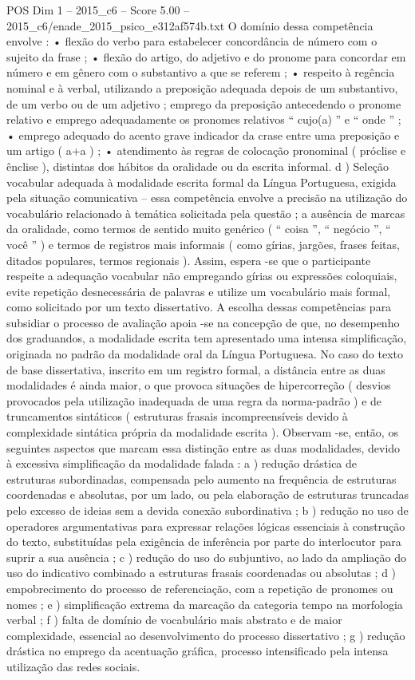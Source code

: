 \begin{textsample}{POS Dim 1 – 2015\_c6 – Score 5.00 – 2015\_c6/enade\_2015\_psico\_e312af574b.txt}
O domínio dessa competência envolve : • flexão do verbo para estabelecer concordância de número com o sujeito da frase ; • flexão do artigo, do adjetivo e do pronome para concordar em número e em gênero com o substantivo a que se referem ; • respeito à regência nominal e à verbal, utilizando a preposição adequada depois de um substantivo, de um verbo ou de um adjetivo ; emprego da preposição antecedendo o pronome relativo e emprego adequadamente os pronomes relativos “ cujo(a) ” e “ onde ” ; • emprego adequado do acento grave indicador da crase entre uma preposição e um artigo ( a+a ) ; • atendimento às regras de colocação pronominal ( próclise e ênclise ), distintas dos hábitos da oralidade ou da escrita informal. d ) Seleção vocabular adequada à modalidade escrita formal da Língua Portuguesa, exigida pela situação comunicativa – essa competência envolve a precisão na utilização do vocabulário relacionado à temática solicitada pela questão ; a ausência de marcas da oralidade, como termos de sentido muito genérico ( “ coisa ”, “ negócio ”, “ você ” ) e termos de registros mais informais ( como gírias, jargões, frases feitas, ditados populares, termos regionais ).
Assim, espera -se que o participante respeite a adequação vocabular não empregando gírias ou expressões coloquiais, evite repetição desnecessária de palavras e utilize um vocabulário mais formal, como solicitado por um texto dissertativo.
A escolha dessas competências para subsidiar o processo de avaliação apoia -se na concepção de que, no desempenho dos graduandos, a modalidade escrita tem apresentado uma intensa simplificação, originada no padrão da modalidade oral da Língua Portuguesa.
No caso do texto de base dissertativa, inscrito em um registro formal, a distância entre as duas modalidades é ainda maior, o que provoca situações de hipercorreção ( desvios provocados pela utilização inadequada de uma regra da norma-padrão ) e de truncamentos sintáticos ( estruturas frasais incompreensíveis devido à complexidade sintática própria da modalidade escrita ).
Observam -se, então, os seguintes aspectos que marcam essa distinção entre as duas modalidades, devido à excessiva simplificação da modalidade falada : a ) redução drástica de estruturas subordinadas, compensada pelo aumento na frequência de estruturas coordenadas e absolutas, por um lado, ou pela elaboração de estruturas truncadas pelo excesso de ideias sem a devida conexão subordinativa ; b ) redução no uso de operadores argumentativas para expressar relações lógicas essenciais à construção do texto, substituídas pela exigência de inferência por parte do interlocutor para suprir a sua ausência ; c ) redução do uso do subjuntivo, ao lado da ampliação do uso do indicativo combinado a estruturas frasais coordenadas ou absolutas ; d ) empobrecimento do processo de referenciação, com a repetição de pronomes ou nomes ; e ) simplificação extrema da marcação da categoria tempo na morfologia verbal ; f ) falta de domínio de vocabulário mais abstrato e de maior complexidade, essencial ao desenvolvimento do processo dissertativo ; g ) redução drástica no emprego da acentuação gráfica, processo intensificado pela intensa utilização das redes sociais.

\end{textsample}

